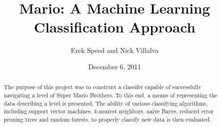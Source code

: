 \documentclass[]{article}   %
\begin{document}
\title{Mario: A Machine Learning Classification Approach}   %

\author{Erek Speed and Nick Villalva}         %
\date{December 6, 2011}    %
\maketitle

\begin{abstract}
 The purpose of this project was to construct a classifer capable of successfully navigating a level of Super Mario Brothers. To this end, a means of representing the data describing a level is presented. The ability of various classifying algorithms, including support vector machines, $k$-nearest neighbors, na\"{i}ve Bayes, reduced error pruning trees and random forests, to properly classify new data is then evaluated.
\end{abstract}
\end{document}

